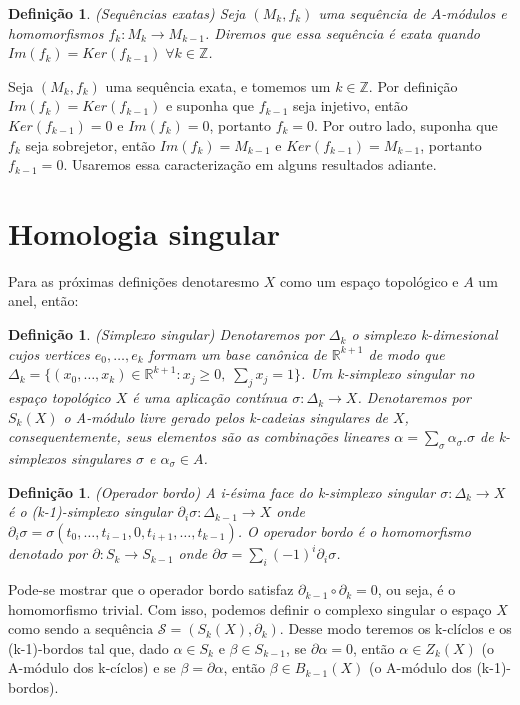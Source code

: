 \documentclass[12pt]{book}
\newtheorem{definicao}[teorema]{Definição}
\newcommand{\real}[1]{\mathbb{R}^{#1}}
\begin{document}
	\begin{definicao}
		(Sequências exatas) Seja $(M_{k}, f_{k})$ uma sequência de $A$-módulos e homomorfismos $f_{k}:M_{k}\to M_{k-1}$. Diremos que essa sequência é exata quando $Im(f_{k})=Ker(f_{k-1}) \; \forall k \in \mathbb{Z}$.
	\end{definicao}
	
	Seja $(M_{k}, f_{k})$ uma sequência exata, e tomemos um $k \in \mathbb{Z}$. Por definição $Im(f_{k}) = Ker(f_{k-1})$ e suponha que $f_{k-1}$ seja injetivo, então $Ker(f_{k-1}) = 0$ e $Im(f_{k}) = 0$, portanto $f_{k} = 0$. Por outro lado, suponha que $f_{k}$ seja sobrejetor, então $Im(f_{k}) = M_{k-1}$ e $Ker(f_{k-1})=M_{k-1}$, portanto $f_{k-1} = 0$. Usaremos essa caracterização em alguns resultados adiante.
	
	\section{Homologia singular}
	Para as próximas definições denotaresmo $X$ como um espaço topológico e $A$ um anel, então:
	\begin{definicao}
		(Simplexo singular) Denotaremos por $\Delta_{k}$ o simplexo k-dimesional cujos vertices $e_{0}, \dots, e_{k}$ formam um base canônica de $\real{k+1}$ de modo que $\Delta_{k} = \{(x_{0}, \dots, x_{k}) \in \real{k+1}: x_{j}\geq 0, \;\sum_{j}x_{j}=1\}$. Um k-simplexo singular no espaço topológico $X$ é uma aplicação contínua $\sigma:\Delta_{k} \to X$. Denotaremos por $S_{k}(X)$ o A-módulo livre gerado pelos k-cadeias singulares de $X$, consequentemente, seus elementos são as combinações lineares $\alpha = \sum_{\sigma} \alpha_{\sigma}.\sigma $ de k-simplexos singulares $\sigma$ e $\alpha_{\sigma} \in A$.
	\end{definicao}
	
	\begin{definicao}
		(Operador bordo) A i-ésima face do k-simplexo singular $\sigma: \Delta_{k} \to X$ é o (k-1)-simplexo singular $\partial_{i}\sigma:\Delta_{k-1} \to X$ onde $\partial_{i}\sigma = \sigma(t_{0}, \dots, t_{i-1},0,t_{i+1}, \dots, t_{k-1})$. O operador bordo é o homomorfismo denotado por $\partial : S_{k} \to S_{k-1}$ onde $\partial\sigma = \sum_{i} (-1)^{i}\partial_{i}\sigma$.
	\end{definicao}
	Pode-se mostrar que o operador bordo satisfaz $\partial_{k-1}\circ\partial_{k} = 0$, ou seja, é o homomorfismo trivial. Com isso, podemos definir o complexo singular o espaço $X$ como sendo a sequência $\mathcal{S} = (S_{k}(X), \partial_{k})$. Desse modo teremos os k-clíclos e os (k-1)-bordos tal que, dado $\alpha \in S_{k}$ e $\beta \in S_{k-1}$, se $\partial\alpha = 0$, então $\alpha \in Z_{k}(X)$ (o A-módulo dos k-cíclos) e se $\beta = \partial\alpha$, então $\beta\in B_{k-1}(X)$ (o A-módulo dos (k-1)-bordos).
	
\end{document}
